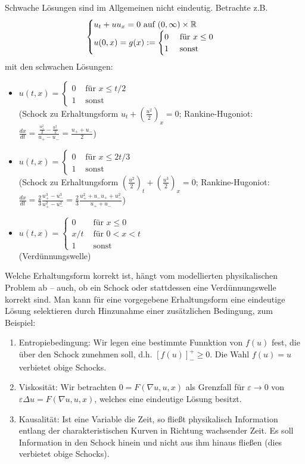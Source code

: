 \begin{bem} \label{bem_19}
	Schwache Lösungen sind im Allgemeinen nicht eindeutig. Betrachte z.B. \marginnote{[19]}
	\[ \begin{cases} 
		u_t + uu_x = 0 \text{ auf } (0,\infty) \times \mathbb{R} \\
		u(0,x) = g(x) := \begin{cases}
			0 & \text{ für } x \leq 0 \\
			1 & \text{ sonst} \end{cases} \end{cases} \]
	mit den schwachen Lösungen:
	\begin{itemize}
		\item $u(t,x) = \begin{cases}
			0 & \text{ für } x \leq t/2 \\
			1 & \text{ sonst} \end{cases}$ \\
		(Schock zu Erhaltungsform $u_t + \left( \frac{u^2}{2} \right)_x = 0$; Rankine-Hugoniot: $\frac{dx}{dt} = \frac{\frac{u_+^2}{2}-\frac{u_-^2}{2}}{u_+-u_-} = \frac{u_++u_-}{2}$)
		\item $u(t,x) = \begin{cases}
			0 & \text{ für } x \leq 2t/3 \\
			1 & \text{ sonst} \end{cases}$ \\
		(Schock zu Erhaltungsform $\left( \frac{u^2}{2} \right)_t + \left( \frac{u^3}{2} \right)_x = 0$; Rankine-Hugoniot: $\frac{dx}{dt} = \frac{2}{3} \frac{u_+^3-u_-^3}{u_+^2-u_-^2} = \frac{2}{3} \frac{u_+^2+u_-u_++u_-^2}{u_++u_-}$)
		\item $u(t,x) = \begin{cases}
			0 & \text{ für } x\leq 0 \\
			x/t & \text{ für } 0 < x < t \\
			1 & \text{ sonst} \end{cases}$ \\
		(Verdünnungswelle)
	\end{itemize}
	Welche Erhaltungsform korrekt ist, hängt vom modellierten physikalischen Problem ab -- auch, ob ein Schock oder stattdessen eine Verdünnungswelle korrekt sind. Man kann für eine vorgegebene Erhaltungsform eine eindeutige Lösung selektieren durch Hinzunahme einer zusätzlichen Bedingung, zum Beispiel: \begin{enumerate}
		\item Entropiebedingung: Wir legen eine bestimmte Funnktion von $f(u)$ fest, die über den Schock zunehmen soll, d.h. $[f(u)]_-^+ \geq 0$. Die Wahl $f(u) = u$ verbietet obige Schocks.
		\item Viskosität: Wir betrachten $0 = F(\nabla u, u, x)$ als Grenzfall für $\varepsilon \rightarrow 0$ von $\varepsilon \Delta u = F(\nabla u,u,x)$, welches eine eindeutige Lösung besitzt.
		\item Kausalität: Ist eine Variable die Zeit, so fließt physikalisch Information entlang der charakteristischen Kurven in Richtung wachsender Zeit. Es soll Information in den Schock hinein und nicht aus ihm hinaus fließen (dies verbietet obige Schocks).
	\end{enumerate}
\end{bem}

